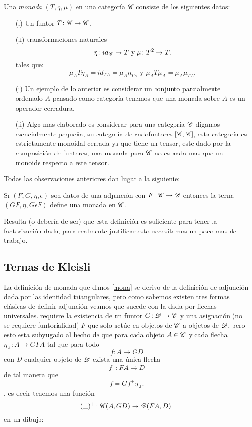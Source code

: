 \documentclass{comunicaciones}
\begin{document}
\begin{dfn}\label{mona}
Una \emph{monada} $(T, \eta, \mu)$ en una categoría $\C$ consiste de los siguientes datos:\begin{itemize}
\item[(i)] Un funtor $T\colon \C\rightarrow\C$.
\item[(ii)] transformaciones naturales \[\eta\colon id_{\C}\rightarrow T\text{ y } \mu\colon T^{2}\rightarrow T.\] tales que:\[\mu_{A} T\eta_{A}=id_{TA}=\mu_{A}\eta_{TA}\text{ y } \mu_{A}T\mu_{A}=\mu_{A}\mu_{TA}.\]  
\end{itemize}


\end{dfn}
\begin{itemize}


\item[(i)]   Un ejemplo de lo anterior es considerar un conjunto parcialmente ordenado $A$ pensado como categoría tenemos que una monada sobre $A$ es un operador cerradura.
\item[(ii)] Algo mas elaborado es considerar para una categoría $\C$ digamos esencialmente pequeña, su categoría de endofuntores $[\C,\C]$, esta categoría es estrictamente monoidal cerrada ya que tiene un tensor, este
 dado por la composición de funtores, una monada para $\C$ no es nada mas que un monoide respecto a este tensor.  

\end{itemize}

Todas las observaciones anteriores dan lugar a la siguiente:

\begin{prop}\label{adjmon}
Si $(F,G,\eta,\epsilon)$ son datos de una adjunción con $F\colon \C\rightarrow\D$ entonces la terna $(GF, \eta,G\epsilon F)$ define una monada en $\EuScript{C}$.
\end{prop}   

Resulta (o debería de ser) que esta definición es suficiente para tener la factorización dada, para realmente justificar esto necesitamos un poco mas de trabajo.

\subsection{Ternas de Kleisli}\label{KLEI}

La definición de monada que dimos \ref{mona} se derivo de la definición de adjunción dada por las identidad triangulares, pero como sabemos existen tres formas clásicas de definir adjunción veamos que sucede con la dada por flechas universales.
requiere la existencia de un funtor $G\colon\D\rightarrow \C$ y una asignación (no se requiere funtorialidad) $F$ que solo actúe en objetos de $\C$ a objetos de $\D$, pero esto esta subyugado al hecho de que para cada objeto $A\in\C$ y cada flecha
$\eta_{A}\colon A\rightarrow GFA$ tal que para todo \[f\colon A\rightarrow GD\] con $D$ cualquier objeto de $\D$ exista una única flecha \[f^{+}\colon FA\rightarrow D\] de tal manera que \[f=Gf^{+}\eta_{A}.\], es decir tenemos
una función \[(\_)^{+}\colon\C(A,GD)\rightarrow\D(FA,D).\] en un dibujo:
\end{document}
